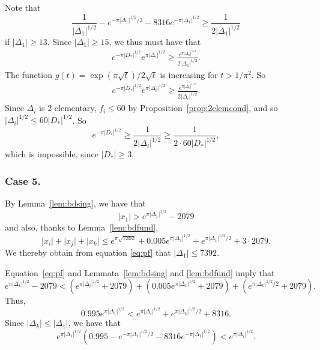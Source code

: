 \documentclass[12pt,a4paper,oneside]{amsart}
\begin{document}
Note that
\[ \frac{1}{\lvert \Delta_1 \rvert^{1/2}} - e^{-\pi \lvert \Delta_1 \rvert^{1/2}/2} - 8316 e^{-\pi \lvert \Delta_1 \rvert^{1/2}} \geq \frac{1}{2 \lvert \Delta_1 \rvert^{1/2}}\]
if $\lvert \Delta_1 \rvert \geq 13$. Since $\lvert \Delta_1 \rvert \geq 15$, we thus must have that
\begin{align*}
e^{-\pi \lvert D_* \rvert^{1/2}} e^{\pi \lvert \Delta_i \rvert^{1/2}} \geq  \frac{e^{\pi \lvert \Delta_1 \rvert^{1/2}}}{2 \lvert \Delta_1 \rvert^{1/2}} .
\end{align*}
The function $g(t) = \exp(\pi \sqrt{t})/2 \sqrt{t}$ is increasing for $t>1/\pi^2$. So
\begin{align*}
	e^{-\pi \lvert D_* \rvert^{1/2}} e^{\pi \lvert \Delta_i \rvert^{1/2}} \geq  \frac{e^{\pi \lvert \Delta_i \rvert^{1/2}}}{2 \lvert \Delta_i \rvert^{1/2}}.
\end{align*}
 Since $\Delta_i$ is $2$-elementary, $f_i \leq 60$ by Proposition~\ref{prop:2elemcond}, and so $\lvert \Delta_i \rvert^{1/2} \leq 60 \lvert D_* \rvert^{1/2}$. So
\[	e^{-\pi \lvert D_* \rvert^{1/2}} \geq  \frac{1}{2 \lvert \Delta_i \rvert^{1/2}} \geq \frac{1}{2 \cdot 60 \lvert D_* \rvert^{1/2}},\]
which is impossible, since $\lvert D_* \rvert \geq 3$.

\subsubsection{Case 5.}\label{subsub:2domcase2} By Lemma~\ref{lem:bdsing}, we have that
\[ \lvert x_1 \rvert > e^{\pi \lvert \Delta_1 \rvert^{1/2}} - 2079\]
and also, thanks to Lemma~\ref{lem:bdfund},
\[ \lvert x_i \rvert + \lvert x_j \rvert + \lvert x_k \rvert \leq  e^{\pi \sqrt{7392}} + 0.005 e^{\pi \lvert \Delta_1 \rvert^{1/2}} + e^{\pi \lvert \Delta_1 \rvert^{1/2}/2} + 3 \cdot 2079.\]
We thereby obtain from equation \eqref{eq:pf} that $\lvert \Delta_1 \rvert \leq 7392$. 

Equation~\eqref{eq:pf} and Lemmata~\ref{lem:bdsing} and \ref{lem:bdfund} imply that
\[ e^{\pi \lvert \Delta_1 \rvert^{1/2}} - 2079 < (e^{\pi \lvert \Delta_i \rvert^{1/2}} + 2079) + (0.005e^{\pi \lvert \Delta_1 \rvert^{1/2}} + 2079) + (e^{\pi \lvert \Delta_k \rvert^{1/2} /2} + 2079).\]
Thus,
\[ 0.995 e^{\pi \lvert \Delta_1 \rvert^{1/2}} < e^{\pi \lvert \Delta_i \rvert^{1/2}} + e^{\pi \lvert \Delta_k \rvert^{1/2} /2} + 8316.\]
Since $\lvert \Delta_k \rvert \leq \lvert \Delta_1 \rvert$, we have that
\[ e^{\pi \lvert \Delta_1 \rvert^{1/2}} (0.995 - e^{- \pi \lvert \Delta_1 \rvert^{1/2} /2} -8316 e^{- \pi \lvert \Delta_1 \rvert^{1/2}}) < e^{\pi \lvert \Delta_i \rvert^{1/2}}.\]
\end{document}
